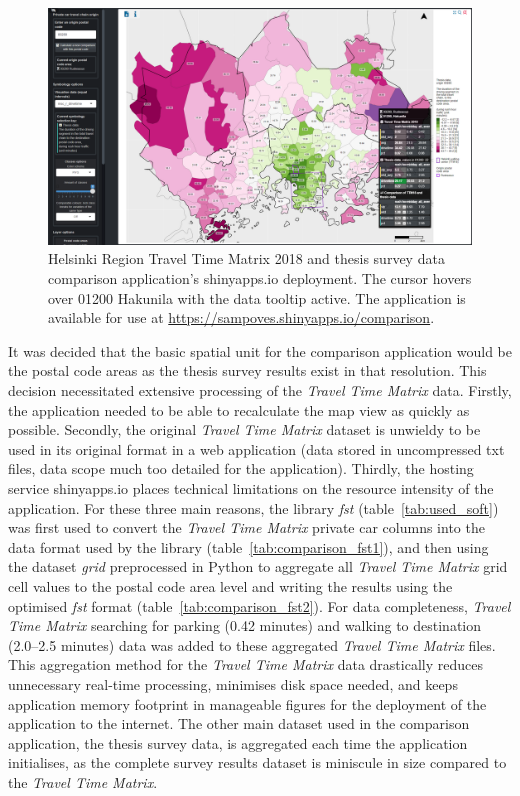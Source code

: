 \begin{figure}[H]%
    \includegraphics[width=\textwidth]{images/shinyapps_comparison.png}
    \caption[Comparison application screenshot]{Helsinki Region Travel Time Matrix 2018 and thesis survey data comparison application's shinyapps.io deployment. The cursor hovers over 01200 Hakunila with the data tooltip active. The application is available for use at \textcolor{blue}{\url{https://sampoves.shinyapps.io/comparison}}.}%
    \label{fig:shinyapps_comparison}%
\end{figure}

It was decided that the basic spatial unit for the comparison application would be the postal code areas as the thesis survey results exist in that resolution. This decision necessitated extensive processing of the \textit{Travel Time Matrix} data. Firstly, the application needed to be able to recalculate the map view as quickly as possible. Secondly, the original \textit{Travel Time Matrix} dataset is unwieldy to be used in its original format in a web application (data stored in uncompressed txt files, data scope much too detailed for the application). Thirdly, the hosting service shinyapps.io places technical limitations on the resource intensity of the application. For these three main reasons, the library \textit{fst} (table~\ref{tab:used_soft}) was first used to convert the \textit{Travel Time Matrix} private car columns into the data format used by the library (table~\ref{tab:comparison_fst1}), and then using the dataset \textit{grid} preprocessed in Python to aggregate all \textit{Travel Time Matrix} grid cell values to the postal code area level and writing the results using the optimised \textit{fst} format (table~\ref{tab:comparison_fst2}). For data completeness, \textit{Travel Time Matrix} searching for parking (0.42 minutes) and walking to destination (2.0--2.5 minutes) data was added to these aggregated \textit{Travel Time Matrix} files. This aggregation method for the \textit{Travel Time Matrix} data drastically reduces unnecessary real-time processing, minimises disk space needed, and keeps application memory footprint in manageable figures for the deployment of the application to the internet. The other main dataset used in the comparison application, the thesis survey data, is aggregated each time the application initialises, as the complete survey results dataset is miniscule in size compared to the \textit{Travel Time Matrix}.

